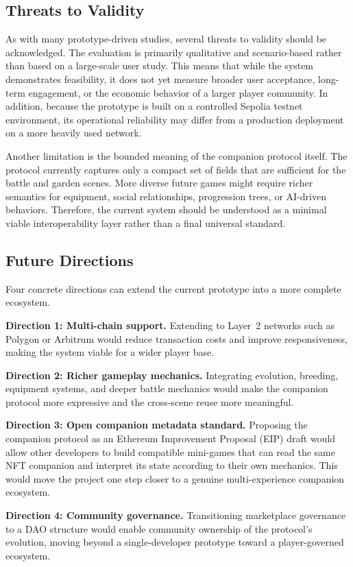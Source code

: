 \documentclass[sigconf]{acmart}
\begin{document}
\subsection{Threats to Validity}
As with many prototype-driven studies, several threats to validity should be acknowledged. The evaluation is primarily qualitative and scenario-based rather than based on a large-scale user study. This means that while the system demonstrates feasibility, it does not yet measure broader user acceptance, long-term engagement, or the economic behavior of a larger player community. In addition, because the prototype is built on a controlled Sepolia testnet environment, its operational reliability may differ from a production deployment on a more heavily used network.

Another limitation is the bounded meaning of the companion protocol itself. The protocol currently captures only a compact set of fields that are sufficient for the battle and garden scenes. More diverse future games might require richer semantics for equipment, social relationships, progression trees, or AI-driven behaviors. Therefore, the current system should be understood as a minimal viable interoperability layer rather than a final universal standard.

\subsection{Future Directions}
Four concrete directions can extend the current prototype into a more complete ecosystem.

\textbf{Direction 1: Multi-chain support.} Extending to Layer~2 networks such as Polygon or Arbitrum would reduce transaction costs and improve responsiveness, making the system viable for a wider player base.

\textbf{Direction 2: Richer gameplay mechanics.} Integrating evolution, breeding, equipment systems, and deeper battle mechanics would make the companion protocol more expressive and the cross-scene reuse more meaningful.

\textbf{Direction 3: Open companion metadata standard.} Proposing the companion protocol as an Ethereum Improvement Proposal (EIP) draft would allow other developers to build compatible mini-games that can read the same NFT companion and interpret its state according to their own mechanics. This would move the project one step closer to a genuine multi-experience companion ecosystem.

\textbf{Direction 4: Community governance.} Transitioning marketplace governance to a DAO structure would enable community ownership of the protocol's evolution, moving beyond a single-developer prototype toward a player-governed ecosystem.
\end{document}

